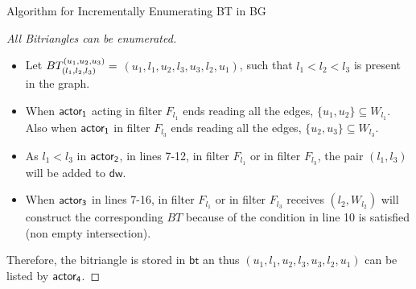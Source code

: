 \begin{frame}[fragile]{Algorithm for Incrementally Enumerating BT in BG}
  \begin{proof}[All Bitriangles can be enumerated] 
    \begin{itemize}
      \item Let $BT_{(l_1, l_2,l_3)}^{(u_1, u_2, u_3)} =$  $(u_1,l_1,u_2,l_3,u_3,l_2,u_1)$, such that $l_1 < l_2 <l_3$ is present in the graph. 
      \item When $\mathsf{actor_1}$ acting in filter $F_{l_1}$ ends reading all the edges, $\{u_1,u_2\} \subseteq W_{l_1}$. Also when $\mathsf{actor_1}$ in filter $F_{l_3}$ ends reading all the edges, $\{u_2,u_3\} \subseteq W_{l_3}$. 
      \item As $l_1 < l_3$ in $\mathsf{actor_2}$, in lines 7-12, in filter $F_{l_1}$ or in filter $F_{l_3}$, the pair $(l_1,l_3)$  will be added to $\mathsf{dw}$.
      \item When $\mathsf{actor_3}$ in lines 7-16, in filter $F_{l_1}$ or in filter $F_{l_3}$ receives $(l_2, W_{l_2})$  will construct the corresponding  $BT$ because of the condition in line 10 is satisfied (non empty intersection). 
    \end{itemize}    
    Therefore, the bitriangle is stored in $\mathsf{bt}$ an thus $(u_1,l_1,u_2,l_3,u_3,l_2,u_1)$ can be listed by $\mathsf{actor_4}$.
  \end{proof}
  
\end{frame} 
\fi
